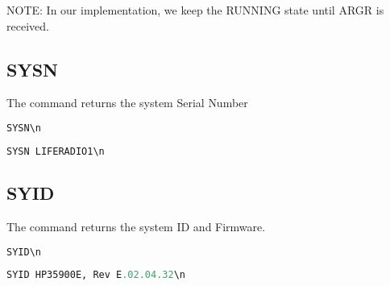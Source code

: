 \documentclass[]{scrartcl}
\begin{document}
NOTE: In our implementation, we keep the RUNNING state until ARGR is received.
	\subsection{SYSN}
	The  command returns the system Serial Number
\begin{lstlisting}[language=Python,escapechar=!,caption=Request (AIC$\rightarrow{}$Instrument),breaklines=true,showspaces=true]
SYSN\n
\end{lstlisting}
\begin{lstlisting}[language=Python,escapechar=!,caption=Response (Instrument$\rightarrow{}$AIC) ,breaklines=true,showspaces=true]
SYSN LIFERADIO1\n
\end{lstlisting}


	\subsection{SYID}
	The  command returns the system ID and Firmware.
\begin{lstlisting}[language=Python,escapechar=!,caption=Request (AIC$\rightarrow{}$Instrument),breaklines=true,showspaces=true]
SYID\n
\end{lstlisting}
\begin{lstlisting}[language=Python,escapechar=!,caption=Response (Instrument$\rightarrow{}$AIC) ,breaklines=true,showspaces=true]
SYID HP35900E, Rev E.02.04.32\n
\end{lstlisting}
\end{document}
